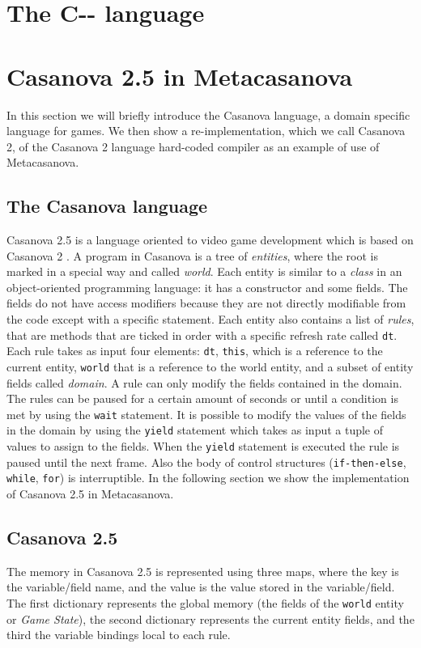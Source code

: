\section{The C-{}- language}

\section{Casanova 2.5 in Metacasanova}
In this section we will briefly introduce the Casanova language, a domain specific language for games. We then show a re-implementation, which we call Casanova 2, of the Casanova 2 language hard-coded compiler as an example of use of Metacasanova.


\subsection{The Casanova language}
Casanova 2.5 is a language oriented to video game development which is based on Casanova 2 \cite{CASANOVA2_PAPER}. A program in Casanova is a tree of \textit{entities}, where the root is marked in a special way and called \textit{world}. Each entity is similar to a \textit{class} in an object-oriented programming language: it has a constructor and some fields. The fields do not have access modifiers because they are not directly modifiable from the code except with a specific statement. Each entity also contains a list of \textit{rules}, that are methods that are ticked in order with a specific refresh rate called \texttt{dt}. Each rule takes as input four elements: \texttt{dt}, \texttt{this}, which is a reference to the current entity, \texttt{world} that is a reference to the world entity, and a subset of entity fields called \textit{domain}. A rule can only modify the fields contained in the domain. The rules can be paused for a certain amount of seconds or until a condition is met by using the \texttt{wait} statement. It is possible to modify the values of the fields in the domain by using the \texttt{yield} statement which takes as input a tuple of values to assign to the fields. When the \texttt{yield} statement is executed the rule is paused until the next frame. Also the body of control structures (\texttt{if-then-else}, \texttt{while}, \texttt{for}) is interruptible. In the following section we show the implementation of Casanova 2.5 in Metacasanova.

\subsection{Casanova 2.5}
The memory in Casanova 2.5 is represented using three maps, where the key is the variable/field name, and the value is the value stored in the variable/field. The first dictionary represents the global memory (the fields of the \texttt{world} entity or \textit{Game State}), the second dictionary represents the current entity fields, and the third the variable bindings local to each rule.

